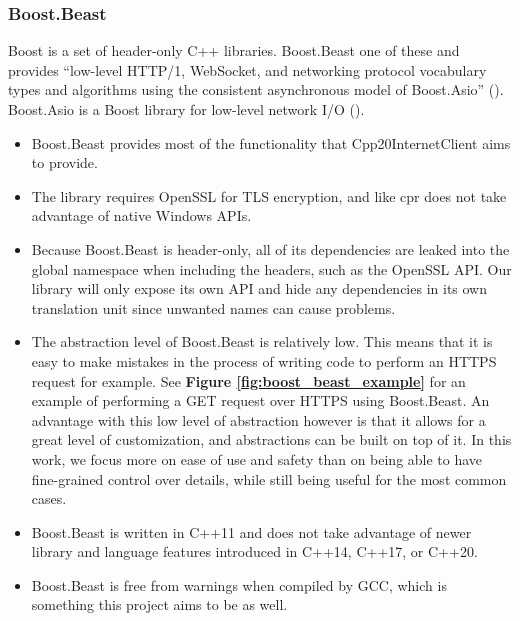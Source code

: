 \documentclass[12pt, a4paper]{article}
\begin{document}
\subsubsection{Boost.Beast}
Boost is a set of header-only C++ libraries. Boost.Beast one of these and provides “low-level HTTP/1, WebSocket, and networking protocol vocabulary types and algorithms using the consistent asynchronous model of Boost.Asio” (\cite{BoostBeast}). Boost.Asio is a Boost library for low-level network I/O (\cite{BoostAsio}).
\begin{itemize}
	\item Boost.Beast provides most of the functionality that Cpp20InternetClient aims to provide.
	\item The library requires OpenSSL for TLS encryption, and like cpr does not take advantage of native Windows APIs.
	\item Because Boost.Beast is header-only, all of its dependencies are leaked into the global namespace when including the headers, such as the OpenSSL API. Our library will only expose its own API and hide any dependencies in its own translation unit since unwanted names can cause problems.
	\item The abstraction level of Boost.Beast is relatively low. This means that it is easy to make mistakes in the process of writing code to perform an HTTPS request for example. See \textbf{Figure \ref{fig:boost_beast_example}} for an example of performing a GET request over HTTPS using Boost.Beast. An advantage with this low level of abstraction however is that it allows for a great level of customization, and abstractions can be built on top of it. In this work, we focus more on ease of use and safety than on being able to have fine-grained control over details, while still being useful for the most common cases.
	\item Boost.Beast is written in C++11 and does not take advantage of newer library and language features introduced in C++14, C++17, or C++20.
	\item Boost.Beast is free from warnings when compiled by GCC, which is something this project aims to be as well.
\end{itemize}
\end{document}

